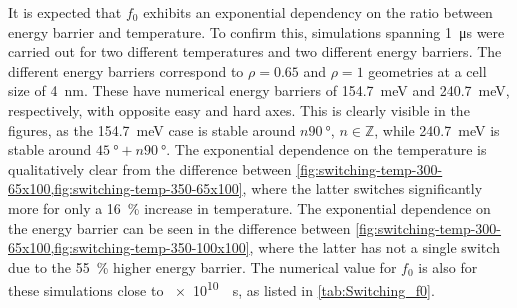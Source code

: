 \documentclass[11pt,a4paper,english]{article}
\begin{document}
It is expected that $f_0$ exhibits an exponential dependency on the ratio between energy barrier and temperature. To confirm this, simulations spanning \SI{1}{\micro\second} were carried out for two different temperatures and two different energy barriers. The different energy barriers correspond to $\rho=0.65$ and $\rho=1$ geometries at a cell size of \SI{4}{\nano\metre}. These have numerical energy barriers of \SI{154.7}{\milli\electronvolt} and \SI{240.7}{\milli\electronvolt}, respectively, with opposite easy and hard axes. This is clearly visible in the figures, as the \SI{154.7}{\milli\electronvolt} case is stable around $n\SI{90}{\degree}$, $n \in \mathbb{Z}$, while \SI{240.7}{\milli\electronvolt} is stable around $\SI{45}{\degree} + n\SI{90}{\degree}$. The exponential dependence on the temperature is qualitatively clear from the difference between \cref{fig:switching-temp-300-65x100,fig:switching-temp-350-65x100}, where the latter switches significantly more for only a \SI{16}{\percent} increase in temperature. The exponential dependence on the energy barrier can be seen in the difference between \cref{fig:switching-temp-300-65x100,fig:switching-temp-350-100x100}, where the latter has not a single switch due to the \SI{55}{\percent} higher energy barrier. The numerical value for $f_0$ is also for these simulations close to \SI{e10}{\per\second}, as listed in \cref{tab:Switching_f0}.
\end{document}
